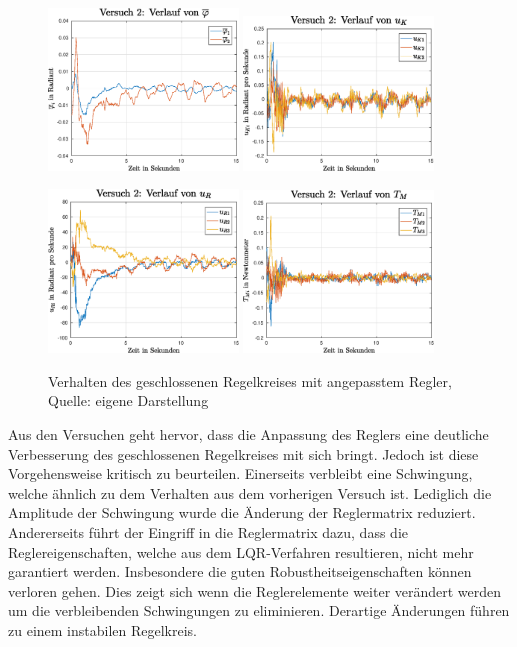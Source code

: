 \begin{figure}[h!]
\centering
\includegraphics[width=0.45\textwidth]{img/exp2_phi.eps}
\includegraphics[width=0.45\textwidth]{img/exp2_uk.eps}
\vspace{0.5cm}

\includegraphics[width=0.45\textwidth]{img/exp2_ur.eps}
\includegraphics[width=0.45\textwidth]{img/exp2_tm.eps}
\caption{Verhalten des geschlossenen Regelkreises mit angepasstem Regler, Quelle: eigene Darstellung}
\end{figure}
Aus den Versuchen geht hervor, dass die Anpassung des Reglers eine deutliche Verbesserung des geschlossenen Regelkreises mit sich bringt. Jedoch ist diese Vorgehensweise kritisch zu beurteilen. Einerseits verbleibt eine Schwingung, welche ähnlich zu dem Verhalten aus dem vorherigen Versuch ist. Lediglich die Amplitude der Schwingung wurde die Änderung der Reglermatrix reduziert. Andererseits führt der Eingriff in die Reglermatrix dazu, dass die Reglereigenschaften, welche aus dem LQR-Verfahren resultieren, nicht mehr garantiert werden. Insbesondere die guten Robustheitseigenschaften können verloren gehen. Dies zeigt sich wenn die Reglerelemente weiter verändert werden um die verbleibenden Schwingungen zu eliminieren. Derartige Änderungen führen zu einem instabilen Regelkreis.